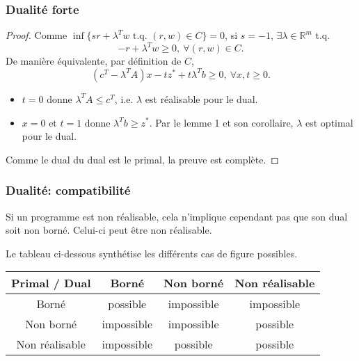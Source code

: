 \documentclass[usepdftitle=false]{beamer}
\def\RR{\mathbb{R}}
\begin{document}
\begin{frame}
\frametitle{Dualité forte}

\begin{proof}
Comme $\inf \lbrace s r + \lambda^T w \mbox{ t.q. } (r,w) \in C \rbrace = 0$, si $s = -1$, $\exists \lambda \in \RR^m$ t.q.
\[
-r + \lambda^Tw \geq 0,\ \forall (r,w) \in C.
\]
De manière équivalente, par définition de $C$,
\[
(c^T-\lambda^TA)x - tz^* + t\lambda^T b \geq 0,\ \forall x, t \geq 0.
\]
\begin{itemize}
	\item 
$t = 0$ donne $\lambda^T A \leq c^T$, i.e. $\lambda$ est réalisable pour le dual.
	\item 
$x = 0$ et $t = 1$ donne $\lambda^T b \geq z^*$. Par le lemme 1 et son corollaire, $\lambda$ est optimal pour le dual.
\end{itemize}

\mbox{}

Comme le dual du dual est le primal, la preuve est complète.
\end{proof}

\end{frame}

\begin{frame}
\frametitle{Dualité: compatibilité}

Si un programme est non réalisable, cela n'implique cependant pas que son dual soit non borné. Celui-ci peut être non réalisable.

\mbox{}

Le tableau ci-dessous synthétise les différents cas de figure possibles.

\begin{center}
\begin{tabular}{|c||c|c|c|}
\hline
Primal / Dual & Borné & Non borné & Non réalisable \\
\hline
\hline
Borné & possible & impossible & impossible \\
\hline
Non borné & impossible & impossible & possible \\
\hline
Non réalisable & impossible & possible & possible \\
\hline
\end{tabular}
\end{center}

\end{frame}
\end{document}
